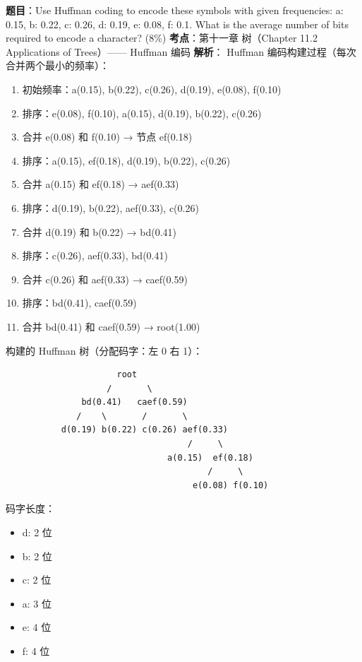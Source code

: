 \documentclass[10pt,a4paper,openany]{ctexbook}
\theoremstyle{definition}
\theoremstyle{remark}
\begin{document}
\textbf{题目}：Use Huffman coding to encode these symbols with given frequencies: a: 0.15, b: 0.22, c: 0.26, d: 0.19, e: 0.08, f: 0.1. What is the average number of bits required to encode a character? (8\%)
\textbf{考点}：第十一章 树（Chapter 11.2 Applications of Trees）—— Huffman 编码
\textbf{解析}：
Huffman 编码构建过程（每次合并两个最小的频率）：
\begin{enumerate}
\item 初始频率：a(0.15), b(0.22), c(0.26), d(0.19), e(0.08), f(0.10)
\item 排序：e(0.08), f(0.10), a(0.15), d(0.19), b(0.22), c(0.26)
\item 合并 e(0.08) 和 f(0.10) → 节点 ef(0.18)
\item 排序：a(0.15), ef(0.18), d(0.19), b(0.22), c(0.26)
\item 合并 a(0.15) 和 ef(0.18) → aef(0.33)
\item 排序：d(0.19), b(0.22), aef(0.33), c(0.26)
\item 合并 d(0.19) 和 b(0.22) → bd(0.41)
\item 排序：c(0.26), aef(0.33), bd(0.41)
\item 合并 c(0.26) 和 aef(0.33) → caef(0.59)
\item 排序：bd(0.41), caef(0.59)
\item 合并 bd(0.41) 和 caef(0.59) → root(1.00)

\end{enumerate}

构建的 Huffman 树（分配码字：左 0 右 1）：
{\footnotesize\begin{verbatim}
                      root
                    /       \
               bd(0.41)   caef(0.59)
              /    \       /       \
           d(0.19) b(0.22) c(0.26) aef(0.33)
                                    /     \
                                a(0.15)  ef(0.18)
                                        /     \
                                     e(0.08) f(0.10)
\end{verbatim}}

码字长度：
\begin{itemize}
\item d: 2 位
\item b: 2 位
\item c: 2 位
\item a: 3 位
\item e: 4 位
\item f: 4 位

\end{itemize}
\end{document}
